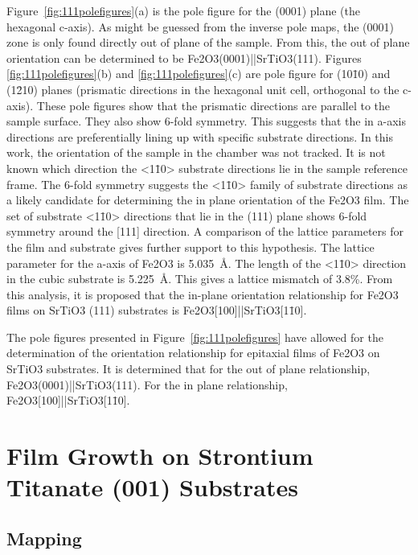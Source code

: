 \documentclass[12pt,%
              twoside,
               letterpaper]{uiothesis}
\begin{document}
Figure~\ref{fig:111polefigures}(a) is the pole figure for the (0001) plane (the hexagonal
c-axis). As might be guessed from the inverse pole maps, the (0001) zone is only found
directly out of plane of the sample. From this, the out of plane orientation can be
determined to be Fe2O3(0001)||SrTiO3(111). Figures \ref{fig:111polefigures}(b)
and \ref{fig:111polefigures}(c) are pole figure for (10\={1}0) and (1\={2}10) planes
(prismatic directions in the hexagonal unit cell, orthogonal to the c-axis). These pole
figures show that the prismatic directions are parallel to the sample surface. They also
show 6-fold  symmetry. This suggests that the in a-axis directions are preferentially
lining up with specific substrate directions. In this work, the orientation of the sample
in the  chamber was not tracked. It is not known which direction the <1\={1}0>
substrate directions lie in the sample reference frame. The 6-fold symmetry suggests the
<1\={1}0> family of substrate directions as a likely candidate for determining the in
plane orientation of the Fe2O3 film. The set of substrate <1\={1}0> directions that
lie in the (111) plane shows 6-fold symmetry around the [111] direction. A comparison of
the lattice parameters for the film and substrate gives further support to this
hypothesis. The lattice parameter for the a-axis of Fe2O3 is \SI{5.035}{\angstrom}.
The length of the <1\={1}0> direction in the cubic substrate is \SI{5.225}{\angstrom}.
This gives a lattice mismatch of 3.8\%. From this analysis, it is proposed that the
in-plane orientation relationship for Fe2O3 films on SrTiO3 (111) substrates is
Fe2O3[100]||SrTiO3[1\={1}0]. 

The pole figures presented in Figure~\ref{fig:111polefigures} have allowed for the
determination of the orientation relationship for epitaxial films of Fe2O3 on
SrTiO3 substrates. It is determined that for the out of plane relationship,
Fe2O3(0001)||SrTiO3(111). For the in plane relationship,
Fe2O3[100]||SrTiO3[1\={1}0].


\section{Film Growth on Strontium Titanate (001) Substrates}
\label{sec:single.growth.001}


\subsection{ Mapping}
\label{subsec:single.growth.mapping}
\end{document}
